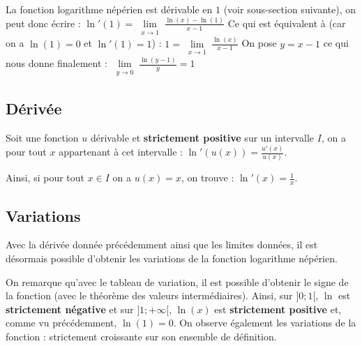 	\begin{demonstration}
		La fonction logarithme népérien est dérivable en $1$ (voir sous-section suivante), on peut donc écrire :
		\newpar
		$\displaystyle{\ln'(1) = \lim\limits_{\substack{x \rightarrow 1}} \frac{\ln(x) - \ln(1)}{x - 1}}$
		\newpar
		Ce qui est équivalent à (car on a $\ln(1) = 0$ et $\ln'(1) = 1$) :
		\newpar
		$\displaystyle{1 = \lim\limits_{\substack{x \rightarrow 1}} \frac{\ln(x)}{x - 1}}$
		\newpar
		On pose $y = x-1$ ce qui nous donne finalement :
		\newpar
		$\displaystyle{\lim\limits_{\substack{y \rightarrow 0}} \frac{\ln(y - 1)}{y} = 1}$
	\end{demonstration}

	\subsection{Dérivée}

	\begin{formula}
		Soit une fonction $u$ dérivable et \textbf{strictement positive} sur un intervalle $I$, on a pour tout $x$ appartenant à cet intervalle :
		\newpar
		$\displaystyle{\ln'(u(x)) = \frac{u'(x)}{u(x)}}$.
	\end{formula}

	\begin{formula}[Dérivée]
		Ainsi, si pour tout $x \in I$ on a $u(x) = x$, on trouve :
		\newpar
		$\displaystyle{\ln'(x) = \frac{1}{x}}$.
	\end{formula}

	\subsection{Variations}

	Avec la dérivée donnée précédemment ainsi que les limites données, il est désormais possible d'obtenir les variations de la fonction logarithme népérien.

	\begin{formula}
		\contentwidth[big]

		On remarque qu'avec le tableau de variation, il est possible d'obtenir le signe de la fonction (avec le théorème des valeurs
		intermédiaires).
		\newpar
		Ainsi, sur $]0;1[$, $\ln$ est \textbf{strictement négative} et sur $]1;+\infty[$,
		$\ln(x)$ est \textbf{strictement positive} et, comme vu précédemment, $\ln(1) = 0$.
		\newpar
		On observe également les variations de la fonction : strictement croissante sur son ensemble de définition.
	\end{formula}

